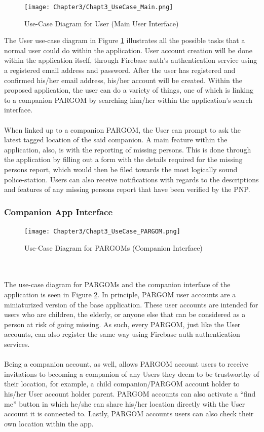 \begin{figure}[!h]
    \centering
    \texttt{[image: Chapter3/Chapt3\_UseCase\_Main.png]}
    \caption{Use-Case Diagram for User (Main User Interface)}
    \label{fig:UseCaseMain}
\end{figure}
The User use-case diagram in Figure \ref{fig:UseCaseMain} illustrates all the possible tasks that a normal user could do within the application. User account creation will be done within the application itself, through Firebase auth’s authentication service using a registered email address and password. After the user has registered and confirmed his/her email address, his/her account will be created. Within the proposed application, the user can do a variety of things, one of which is linking to a companion PARGOM by searching him/her within the application’s search interface. 
\\\\When linked up to a companion PARGOM, the User can prompt to ask the latest tagged location of the said companion. A main feature within the application, also, is with the reporting of missing persons. This is done through the application by filling out a form with the details required for the missing persons report, which would then be filed towards the most logically sound police-station. Users can also receive notifications with regards to the descriptions and features of any missing persons report that have been verified by the PNP.

\subsubsection{Companion App Interface}

\begin{figure}[!h]
    \centering
    \texttt{[image: Chapter3/Chapt3\_UseCase\_PARGOM.png]}
    \caption{Use-Case Diagram for PARGOMs (Companion Interface)}
    \label{fig:UseCasePARGOM}
\end{figure}
\\\\The use-case diagram for PARGOMs and the companion interface of the application is seen in Figure \ref{fig:UseCasePARGOM}. In principle, PARGOM user accounts are a miniaturized version of the base application. These user accounts are intended for users who are children, the elderly, or anyone else that can be considered as a person at risk of going missing. As such, every PARGOM, just like the User accounts, can also register the same way using Firebase auth authentication services. 
\\\\Being a companion account, as well, allows PARGOM account users to receive invitations to becoming a companion of any Users they deem to be trustworthy of their location, for example, a child companion/PARGOM account holder to his/her User account holder parent. PARGOM accounts can also activate a “find me” button in which he/she can share his/her location directly with the User account it is connected to. Lastly, PARGOM accounts users can also check their own location within the app.

